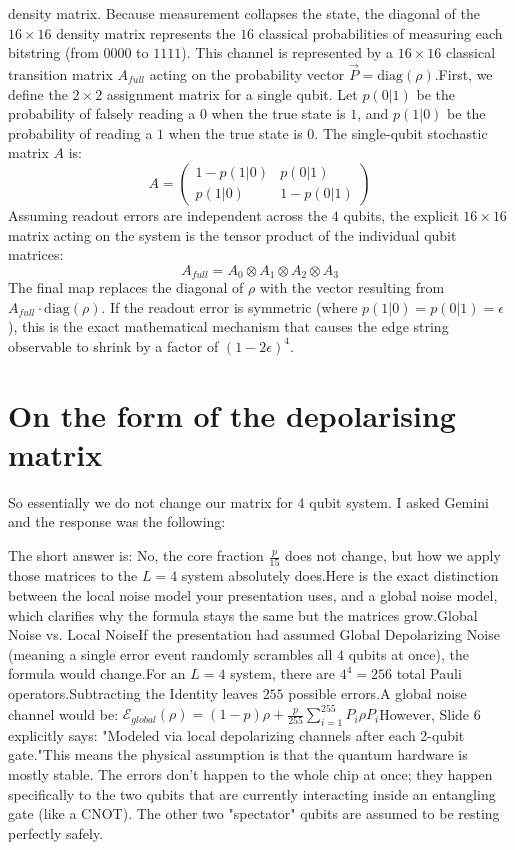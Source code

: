 \documentclass[11pt]{article}
\begin{document}
density matrix. Because measurement collapses the state, the diagonal of the $16 \times 16$ density matrix represents the $16$ classical probabilities of measuring each bitstring (from $0000$ to $1111$).  This channel is represented by a $16 \times 16$ classical transition matrix $A_{full}$ acting on the probability vector $\vec{P} = \text{diag}(\rho)$.First, we define the $2 \times 2$ assignment matrix for a single qubit. Let $p(0|1)$ be the probability of falsely reading a $0$ when the true state is $1$, and $p(1|0)$ be the probability of reading a $1$ when the true state is $0$. The single-qubit stochastic matrix $A$ is:  $$A = \begin{pmatrix} 1 - p(1|0) & p(0|1) \\ p(1|0) & 1 - p(0|1) \end{pmatrix}$$Assuming readout errors are independent across the $4$ qubits, the explicit $16 \times 16$ matrix acting on the system is the tensor product of the individual qubit matrices:$$A_{full} = A_0 \otimes A_1 \otimes A_2 \otimes A_3$$The final map replaces the diagonal of $\rho$ with the vector resulting from $A_{full} \cdot \text{diag}(\rho)$. If the readout error is symmetric (where $p(1|0) = p(0|1) = \epsilon$ ), this is the exact mathematical mechanism that causes the edge string observable to shrink by a factor of $(1-2\epsilon)^4$.

\section{On the form of the depolarising matrix}
So essentially we do not change our matrix for 4 qubit system. I asked Gemini and the response was the following:

The short answer is: No, the core fraction $\frac{p}{15}$ does not change, but how we apply those matrices to the $L=4$ system absolutely does.Here is the exact distinction between the local noise model your presentation uses, and a global noise model, which clarifies why the formula stays the same but the matrices grow.Global Noise vs. Local NoiseIf the presentation had assumed Global Depolarizing Noise (meaning a single error event randomly scrambles all $4$ qubits at once), the formula would change.For an $L=4$ system, there are $4^4 = 256$ total Pauli operators.Subtracting the Identity leaves $255$ possible errors.A global noise channel would be: $\mathcal{E}_{global}(\rho) = (1-p)\rho + \frac{p}{255} \sum_{i=1}^{255} P_i \rho P_i$However, Slide 6 explicitly says: "Modeled via local depolarizing channels after each 2-qubit gate."This means the physical assumption is that the quantum hardware is mostly stable. The errors don't happen to the whole chip at once; they happen specifically to the two qubits that are currently interacting inside an entangling gate (like a CNOT). The other two "spectator" qubits are assumed to be resting perfectly safely.
\end{document}
